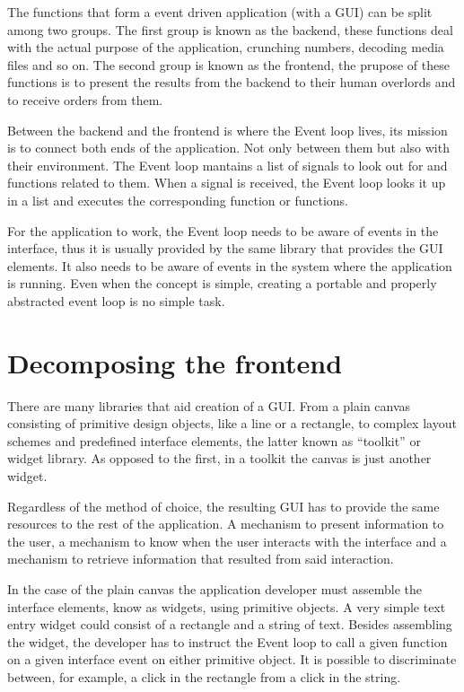 \documentclass[12pt,a4paper,english]{book}
\begin{document}
The functions that form a event driven application (with a GUI) can be split
among two groups. The first group is known as the backend, these functions deal
with the actual purpose of the application, crunching numbers, decoding media
files and so on. The second group is known as the frontend, the prupose of
these functions is to present the results from the backend to their human
overlords and to receive orders from them.

Between the backend and the frontend is where the Event loop lives, its mission
is to connect both ends of the application. Not only between them but also with
their environment. The Event loop mantains a list of signals to look out for
and functions related to them. When a signal is received, the Event loop looks
it up in a list and executes the corresponding function or functions.

For the application to work, the Event loop needs to be aware of events in the
interface, thus it is  usually provided by the same library that provides the
GUI elements. It also needs to be aware of events in the system where the
application is running. Even when the concept is simple, creating a portable
and properly abstracted event loop is no simple task.



\hypertarget{decomposing-the-frontend}{}
\section{Decomposing the frontend}

There are many libraries that aid creation of a GUI. From a plain canvas
consisting of primitive design objects, like a line or a rectangle, to complex
layout schemes and predefined interface elements, the latter known as ``toolkit''
or widget library. As opposed to the first, in a toolkit the canvas is just
another widget.

Regardless of the method of choice, the resulting GUI has to provide the same
resources to the rest of the application. A mechanism to present information
to the user, a mechanism to know when the user interacts with the interface and
a mechanism to retrieve information that resulted from said interaction.

In the case of the plain canvas the application developer must assemble the
interface elements, know as widgets, using primitive objects. A very simple
text entry widget could consist of a rectangle and a string of text. Besides
assembling the widget, the developer has to instruct the Event loop  to call a
given function on a given interface event on either primitive object. It is
possible to discriminate between, for example, a click in the rectangle from a
click in the string.
\end{document}
